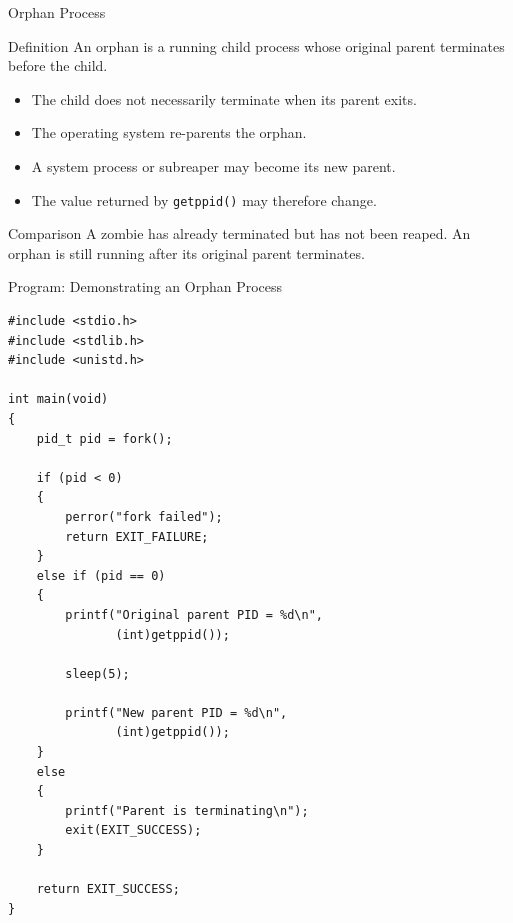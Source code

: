 \documentclass[aspectratio=169]{beamer}
\begin{document}
\begin{frame}{Orphan Process}

\begin{block}{Definition}
An orphan is a running child process whose original parent terminates before the
child.
\end{block}

\begin{itemize}
    \item The child does not necessarily terminate when its parent exits.
    \item The operating system re-parents the orphan.
    \item A system process or subreaper may become its new parent.
    \item The value returned by \texttt{getppid()} may therefore change.
\end{itemize}

\begin{alertblock}{Comparison}
A zombie has already terminated but has not been reaped. An orphan is still
running after its original parent terminates.
\end{alertblock}

\end{frame}

\begin{frame}[fragile]{Program: Demonstrating an Orphan Process}

\begin{lstlisting}[style=cstyle]
#include <stdio.h>
#include <stdlib.h>
#include <unistd.h>

int main(void)
{
    pid_t pid = fork();

    if (pid < 0)
    {
        perror("fork failed");
        return EXIT_FAILURE;
    }
    else if (pid == 0)
    {
        printf("Original parent PID = %d\n",
               (int)getppid());

        sleep(5);

        printf("New parent PID = %d\n",
               (int)getppid());
    }
    else
    {
        printf("Parent is terminating\n");
        exit(EXIT_SUCCESS);
    }

    return EXIT_SUCCESS;
}
\end{lstlisting}

\end{frame}
\end{document}
